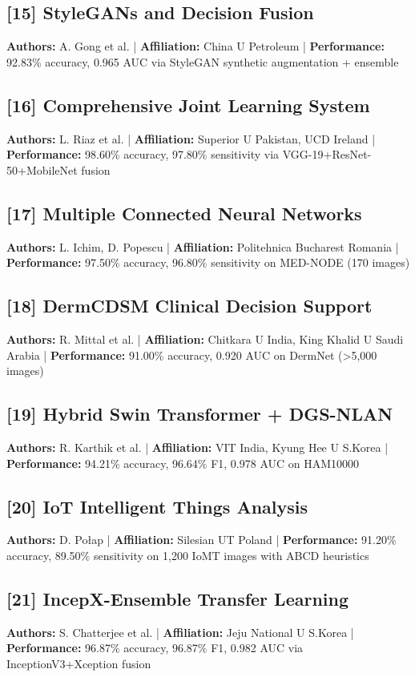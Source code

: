 \documentclass[10pt,twocolumn]{article}
\begin{document}
\subsection*{[15] StyleGANs and Decision Fusion}
\textbf{Authors:} A. Gong et al. | \textbf{Affiliation:} China U Petroleum | \textbf{Performance:} 92.83\% accuracy, 0.965 AUC via StyleGAN synthetic augmentation + ensemble

\subsection*{[16] Comprehensive Joint Learning System}
\textbf{Authors:} L. Riaz et al. | \textbf{Affiliation:} Superior U Pakistan, UCD Ireland | \textbf{Performance:} 98.60\% accuracy, 97.80\% sensitivity via VGG-19+ResNet-50+MobileNet fusion

\subsection*{[17] Multiple Connected Neural Networks}
\textbf{Authors:} L. Ichim, D. Popescu | \textbf{Affiliation:} Politehnica Bucharest Romania | \textbf{Performance:} 97.50\% accuracy, 96.80\% sensitivity on MED-NODE (170 images)

\subsection*{[18] DermCDSM Clinical Decision Support}
\textbf{Authors:} R. Mittal et al. | \textbf{Affiliation:} Chitkara U India, King Khalid U Saudi Arabia | \textbf{Performance:} 91.00\% accuracy, 0.920 AUC on DermNet (>5,000 images)

\subsection*{[19] Hybrid Swin Transformer + DGS-NLAN}
\textbf{Authors:} R. Karthik et al. | \textbf{Affiliation:} VIT India, Kyung Hee U S.Korea | \textbf{Performance:} 94.21\% accuracy, 96.64\% F1, 0.978 AUC on HAM10000

\subsection*{[20] IoT Intelligent Things Analysis}
\textbf{Authors:} D. Połap | \textbf{Affiliation:} Silesian UT Poland | \textbf{Performance:} 91.20\% accuracy, 89.50\% sensitivity on 1,200 IoMT images with ABCD heuristics

\subsection*{[21] IncepX-Ensemble Transfer Learning}
\textbf{Authors:} S. Chatterjee et al. | \textbf{Affiliation:} Jeju National U S.Korea | \textbf{Performance:} 96.87\% accuracy, 96.87\% F1, 0.982 AUC via InceptionV3+Xception fusion
\end{document}
